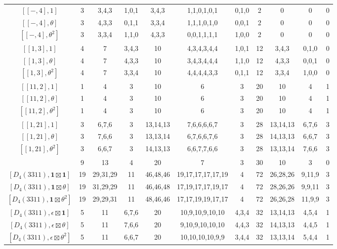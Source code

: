 \begin{table}[ht]
\begin{adjustbox}{max width=\linewidth}
\begin{tabular}{|c|cccccccccc|}
        $[[-,4],1]$ & 3 & 3,4,3 & 1,0,1 & 3,4,3 & 1,1,0,1,0,1 & 0,1,0 & 2 & 0 & 0 & 0 \\
        $[[-,4],\theta]$ & 3 & 4,3,3 & 0,1,1 & 3,3,4 & 1,1,1,0,1,0 & 0,0,1 & 2 & 0 & 0 & 0 \\ 
        $[[-,4],\theta^2]$ & 3 & 3,3,4 & 1,1,0 & 4,3,3 & 0,0,1,1,1,1 & 1,0,0 & 2 & 0 & 0 & 0 \\ \hline
        $[[1,3],1]$ & 4 & 7 & 3,4,3 & 10 & 4,3,4,3,4,4 & 1,0,1 & 12 & 3,4,3 & 0,1,0 & 0 \\
        $[[1,3],\theta]$ & 4 & 7 & 4,3,3 & 10 & 3,4,3,4,4,4 & 1,1,0 & 12 & 4,3,3 & 0,0,1 & 0 \\
        $[[1,3],\theta^2]$ & 4 & 7 & 3,3,4 & 10 & 4,4,4,4,3,3 & 0,1,1 & 12 & 3,3,4 & 1,0,0 & 0 \\ \hline
        $[[11,2],1]$ & 1 & 4 & 3 & 10 & 6 & 3 & 20 & 10 & 4 & 1 \\
        $[[11,2],\theta]$ & 1 & 4 & 3 & 10 & 6 & 3 & 20 & 10 & 4 & 1 \\
        $[[11,2],\theta^2]$ & 1 & 4 & 3 & 10 & 6 & 3 & 20 & 10 & 4 & 1 \\ \hline
        $[[1,21],1]$ & 3 & 6,7,6 & 3 & 13,14,13 & 7,6,6,6,6,7 & 3 & 28 & 13,14,13 & 6,7,6 & 3 \\
        $[[1,21],\theta]$ & 3 & 7,6,6 & 3 & 13,13,14 & 6,7,6,6,7,6 & 3 & 28 & 14,13,13 & 6,6,7 & 3 \\
        $[[1,21],\theta^2]$ & 3 & 6,6,7 & 3 & 14,13,13 & 6,6,7,7,6,6 & 3 & 28 & 13,13,14 & 7,6,6 & 3 \\ \hline
        [$3$-dim reps,-] & 9 & 13 & 4 & 20 & 7 & 3 & 30 & 10 & 3 & 0 \\\hline
        $[D_4(3311),\mathbf{1}\boxtimes\mathbf{1}]$ & 19 & 29,31,29 & 11 & 46,48,46 & 19,17,17,17,17,19 & 4 & 72 & 26,28,26 & 9,11,9 & 3 \\
        $[D_4(3311),\mathbf{1}\boxtimes\theta]$ & 19 & 31,29,29 & 11 & 46,46,48 & 17,19,17,17,19,17 & 4 & 72 & 28,26,26 & 9,9,11 & 3 \\
        $[D_4(3311),\mathbf{1}\boxtimes\theta^2]$ & 19 & 29,29,31 & 11 & 48,46,46 & 17,17,19,19,17,17 & 4 & 72 & 26,26,28 & 11,9,9 & 3 \\
        $[D_4(3311),\epsilon\boxtimes\mathbf{1}]$ & 5 & 11 & 6,7,6 & 20 & 10,9,10,9,10,10 & 4,3,4 & 32 & 13,14,13 & 4,5,4 & 1 \\
        $[D_4(3311),\epsilon\boxtimes\theta]$ & 5 & 11 & 7,6,6 & 20 & 9,10,9,10,10,10 & 4,4,3 & 32 & 14,13,13 & 4,4,5 & 1 \\
        $[D_4(3311),\epsilon\boxtimes\theta^2]$ & 5 & 11 & 6,6,7 & 20 & 10,10,10,10,9,9 & 3,4,4 & 32 & 13,13,14 & 5,4,4 & 1  \\\hline


        \end{tabular}
        \end{adjustbox}
    \end{table}
    \fi


